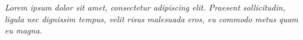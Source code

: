%
%
%

\begin{dedicatoria}
\vspace*{\fill}
\centering
\noindent
\textit{%
Lorem ipsum dolor sit amet, consectetur adipiscing elit. Praesent sollicitudin,
ligula nec dignissim tempus, velit risus malesuada eros, eu commodo metus quam
eu magna.
}
\vspace*{\fill}
\end{dedicatoria}

